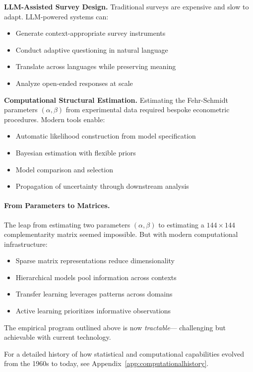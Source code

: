 \textbf{LLM-Assisted Survey Design.}
Traditional surveys are expensive and slow to adapt.
LLM-powered systems \citep{brown2020,vaswani2017} can:
\begin{itemize}
  \item Generate context-appropriate survey instruments
  \item Conduct adaptive questioning in natural language
  \item Translate across languages while preserving meaning
  \item Analyze open-ended responses at scale
\end{itemize}

\textbf{Computational Structural Estimation.}
Estimating the Fehr-Schmidt parameters $(\alpha, \beta)$ from experimental data
required bespoke econometric procedures. Modern tools enable:
\begin{itemize}
  \item Automatic likelihood construction from model specification
  \item Bayesian estimation with flexible priors
  \item Model comparison and selection
  \item Propagation of uncertainty through downstream analysis
\end{itemize}

\paragraph{From Parameters to Matrices.}
The leap from estimating two parameters $(\alpha, \beta)$ to estimating
a $144 \times 144$ complementarity matrix seemed impossible.
But with modern computational infrastructure:
\begin{itemize}
  \item Sparse matrix representations reduce dimensionality
  \item Hierarchical models pool information across contexts
  \item Transfer learning leverages patterns across domains
  \item Active learning prioritizes informative observations
\end{itemize}

The empirical program outlined above is now \emph{tractable}---
challenging but achievable with current technology.

For a detailed history of how statistical and computational capabilities
evolved from the 1960s to today, see Appendix~\ref{app:computationalhistory}.

